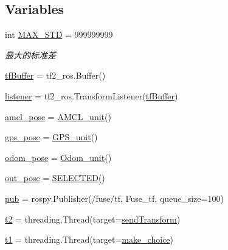 \subsection*{Variables}
\begin{DoxyCompactItemize}
\item 
int \hyperlink{namespacefuse___g___a__dox_a7926ebd96da06b98fb5456a8ad2b91fe}{M\+A\+X\+\_\+\+S\+TD} = 999999999
\begin{DoxyCompactList}\small\item\em 最大的标准差 \end{DoxyCompactList}\item 
\hyperlink{namespacefuse___g___a__dox_a8ae9d461cb984beb56dc05ab5626f0fa}{tf\+Buffer} = tf2\+\_\+ros.\+Buffer()
\item 
\hyperlink{namespacefuse___g___a__dox_af9e2cb2b46ad831441999e98b719ddac}{listener} = tf2\+\_\+ros.\+Transform\+Listener(\hyperlink{namespacefuse___g___a__dox_a8ae9d461cb984beb56dc05ab5626f0fa}{tf\+Buffer})
\item 
\hyperlink{namespacefuse___g___a__dox_a16622f55cce6126a0d148d928851a0bc}{amcl\+\_\+pose} = \hyperlink{classfuse___g___a__dox_1_1_a_m_c_l__unit}{A\+M\+C\+L\+\_\+unit}()
\item 
\hyperlink{namespacefuse___g___a__dox_a09f59f9373060068bdb3831fa1af70d8}{gps\+\_\+pose} = \hyperlink{classfuse___g___a__dox_1_1_g_p_s__unit}{G\+P\+S\+\_\+unit}()
\item 
\hyperlink{namespacefuse___g___a__dox_abfd9a9f651abe0cd57872120a5fc770d}{odom\+\_\+pose} = \hyperlink{classfuse___g___a__dox_1_1_odom__unit}{Odom\+\_\+unit}()
\item 
\hyperlink{namespacefuse___g___a__dox_a3df8ccaf4e9766e9c97abe02f7b8e9c6}{out\+\_\+pose} = \hyperlink{classfuse___g___a__dox_1_1_s_e_l_e_c_t_e_d}{S\+E\+L\+E\+C\+T\+ED}()
\item 
\hyperlink{namespacefuse___g___a__dox_af5a011d160dec3e582508223494e25b1}{pub} = rospy.\+Publisher(\textquotesingle{}/fuse/tf\textquotesingle{}, Fuse\+\_\+tf, queue\+\_\+size=100)
\item 
\hyperlink{namespacefuse___g___a__dox_a8259a50c04254f445d14a4f3e5af45de}{t2} = threading.\+Thread(target=\hyperlink{namespacefuse___g___a__dox_ad108902a215abb21ef4598a8465d1513}{send\+Transform})
\item 
\hyperlink{namespacefuse___g___a__dox_a34cdbd8e1cd88bd38360293158d2418b}{t1} = threading.\+Thread(target=\hyperlink{namespacefuse___g___a__dox_ad6aad4771679d9483d428a51103c238b}{make\+\_\+choice})
\end{DoxyCompactItemize}


